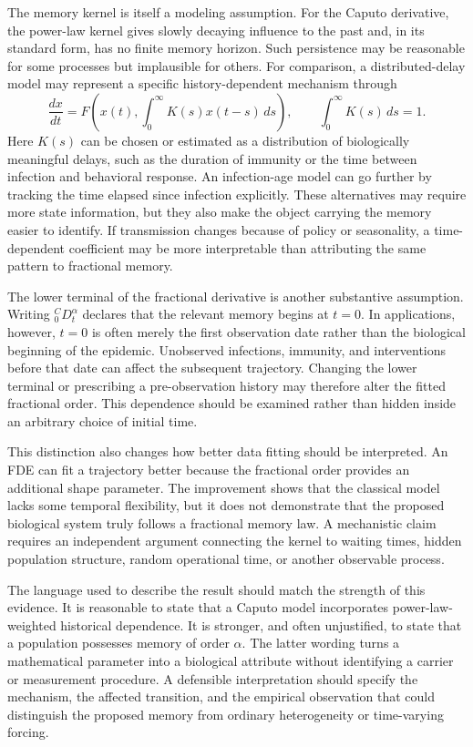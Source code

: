 \documentclass[00-main.tex]{subfiles}
\begin{document}
The memory kernel is itself a modeling assumption.
For the Caputo derivative, the power-law kernel gives slowly decaying influence to the past and, in its standard form, has no finite memory horizon.
Such persistence may be reasonable for some processes but implausible for others.
For comparison, a distributed-delay model may represent a specific history-dependent mechanism through
\[
\frac{dx}{dt}
=F\!\left(x(t),
\int_{0}^{\infty}K(s)x(t-s)\,ds\right),
\qquad
\int_{0}^{\infty}K(s)\,ds=1.
\]
Here $K(s)$ can be chosen or estimated as a distribution of biologically meaningful delays, such as the duration of immunity or the time between infection and behavioral response.
An infection-age model can go further by tracking the time elapsed since infection explicitly.
These alternatives may require more state information, but they also make the object carrying the memory easier to identify.
If transmission changes because of policy or seasonality, a time-dependent coefficient may be more interpretable than attributing the same pattern to fractional memory.

The lower terminal of the fractional derivative is another substantive assumption.
Writing ${}_{0}^{C}\!D_t^{\alpha}$ declares that the relevant memory begins at $t=0$.
In applications, however, $t=0$ is often merely the first observation date rather than the biological beginning of the epidemic.
Unobserved infections, immunity, and interventions before that date can affect the subsequent trajectory.
Changing the lower terminal or prescribing a pre-observation history may therefore alter the fitted fractional order.
This dependence should be examined rather than hidden inside an arbitrary choice of initial time.

This distinction also changes how better data fitting should be interpreted.
An FDE can fit a trajectory better because the fractional order provides an additional shape parameter.
The improvement shows that the classical model lacks some temporal flexibility, but it does not demonstrate that the proposed biological system truly follows a fractional memory law.
A mechanistic claim requires an independent argument connecting the kernel to waiting times, hidden population structure, random operational time, or another observable process.

The language used to describe the result should match the strength of this evidence.
It is reasonable to state that a Caputo model incorporates power-law-weighted historical dependence.
It is stronger, and often unjustified, to state that a population possesses memory of order $\alpha$.
The latter wording turns a mathematical parameter into a biological attribute without identifying a carrier or measurement procedure.
A defensible interpretation should specify the mechanism, the affected transition, and the empirical observation that could distinguish the proposed memory from ordinary heterogeneity or time-varying forcing.
\end{document}
